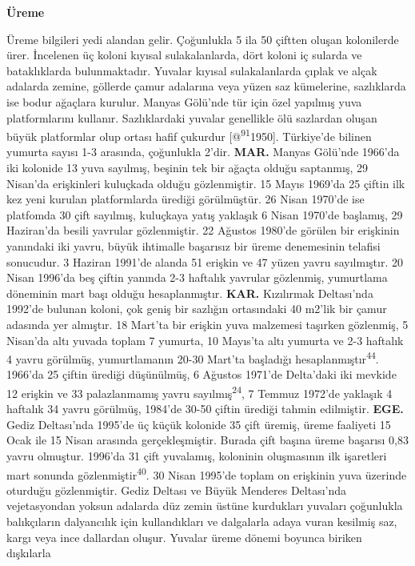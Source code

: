 \documentclass[
  letterpaper,
  DIV=11,
  numbers=noendperiod]{scrreprt}
\begin{document}
\textbf{Üreme}

Üreme bilgileri yedi alandan gelir. Çoğunlukla 5 ila 50 çiftten oluşan
kolonilerde ürer. İncelenen üç koloni kıyısal sulakalanlarda, dört
koloni iç sularda ve bataklıklarda bulunmaktadır. Yuvalar kıyısal
sulakalanlarda çıplak ve alçak adalarda zemine, göllerde çamur adalarına
veya yüzen saz kümelerine, sazlıklarda ise bodur ağaçlara kurulur.
Manyas Gölü'nde tür için özel yapılmış yuva platformlarını kullanır.
Sazlıklardaki yuvalar genellikle ölü sazlardan oluşan büyük platformlar
olup ortası hafif çukurdur {[}@\textsuperscript{91}1950{]}. Türkiye'de
bilinen yumurta sayısı 1-3 arasında, çoğunlukla 2'dir. \textbf{MAR.}
Manyas Gölü'nde 1966'da iki kolonide 13 yuva sayılmış, beşinin tek bir
ağaçta olduğu saptanmış, 29 Nisan'da erişkinleri kuluçkada olduğu
gözlenmiştir. 15 Mayıs 1969'da 25 çiftin ilk kez yeni kurulan
platformlarda ürediği görülmüştür. 26 Nisan 1970'de ise platfomda 30
çift sayılmış, kuluçkaya yatış yaklaşık 6 Nisan 1970'de başlamış, 29
Haziran'da besili yavrular gözlenmiştir. 22 Ağustos 1980'de görülen bir
erişkinin yanındaki iki yavru, büyük ihtimalle başarısız bir üreme
denemesinin telafisi sonucudur. 3 Haziran 1991'de alanda 51 erişkin ve
47 yüzen yavru sayılmıştır. 20 Nisan 1996'da beş çiftin yanında 2-3
haftalık yavrular gözlenmiş, yumurtlama döneminin mart başı olduğu
hesaplanmıştır. \textbf{KAR.} Kızılırmak Deltası'nda 1992'de bulunan
koloni, çok geniş bir sazlığın ortasındaki 40 m2'lik bir çamur adasında
yer almıştır. 18 Mart'ta bir erişkin yuva malzemesi taşırken gözlenmiş,
5 Nisan'da altı yuvada toplam 7 yumurta, 10 Mayıs'ta altı yumurta ve 2-3
haftalık 4 yavru görülmüş, yumurtlamanın 20-30 Mart'ta başladığı
hesaplanmıştır\textsuperscript{44}. 1966'da 25 çiftin ürediği
düşünülmüş, 6 Ağustos 1971'de Delta'daki iki mevkide 12 erişkin ve 33
palazlanmamış yavru sayılmış\textsuperscript{24}, 7 Temmuz 1972'de
yaklaşık 4 haftalık 34 yavru görülmüş, 1984'de 30-50 çiftin ürediği
tahmin edilmiştir. \textbf{EGE.} Gediz Deltası'nda 1995'de üç küçük
kolonide 35 çift üremiş, üreme faaliyeti 15 Ocak ile 15 Nisan arasında
gerçekleşmiştir. Burada çift başına üreme başarısı 0,83 yavru olmuştur.
1996'da 31 çift yuvalamış, koloninin oluşmasının ilk işaretleri mart
sonunda gözlenmiştir\textsuperscript{40}. 30 Nisan 1995'de toplam on
erişkinin yuva üzerinde oturduğu gözlenmiştir. Gediz Deltası ve Büyük
Menderes Deltası'nda vejetasyondan yoksun adalarda düz zemin üstüne
kurdukları yuvaları çoğunlukla balıkçıların dalyancılık için
kullandıkları ve dalgalarla adaya vuran kesilmiş saz, kargı veya ince
dallardan oluşur. Yuvalar üreme dönemi boyunca biriken dışkılarla
\end{document}
